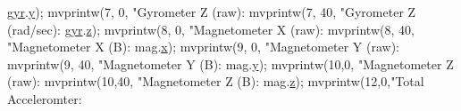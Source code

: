 \begin{DoxyCode}
{{{{{{{{{{      \hyperlink{structIMU__DATA__STRUCT_1_1calibrated_a8a54aded6ce608f1b7d2b4a0c52c248b}{gyr}.\hyperlink{structDATA__XYZ__DOUBLE_a198a27b5df3b5b0bf461b0e481e22a82}{y});
        mvprintw(7, 0, \textcolor{stringliteral}{"Gyrometer Z (raw):     %
        mvprintw(7, 40, \textcolor{stringliteral}{"Gyrometer Z (rad/sec):   %
      \hyperlink{structIMU__DATA__STRUCT_1_1calibrated_a8a54aded6ce608f1b7d2b4a0c52c248b}{gyr}.\hyperlink{structDATA__XYZ__DOUBLE_a9556e8868c223ff3e28756ea18a284c0}{z});
        mvprintw(8, 0, \textcolor{stringliteral}{"Magnetometer X (raw):  %
        mvprintw(8, 40, \textcolor{stringliteral}{"Magnetometer X (B):     %
      mag}.\hyperlink{structDATA__XYZ__DOUBLE_a22868cc99a423900e7b82d015a5eb91f}{x});
        mvprintw(9, 0, \textcolor{stringliteral}{"Magnetometer Y (raw):  %
        mvprintw(9, 40, \textcolor{stringliteral}{"Magnetometer Y (B):     %
      mag}.\hyperlink{structDATA__XYZ__DOUBLE_a198a27b5df3b5b0bf461b0e481e22a82}{y});
        mvprintw(10,0, \textcolor{stringliteral}{"Magnetometer Z (raw):  %
        mvprintw(10,40, \textcolor{stringliteral}{"Magnetometer Z (B):     %
      mag}.\hyperlink{structDATA__XYZ__DOUBLE_a9556e8868c223ff3e28756ea18a284c0}{z});
        mvprintw(12,0,\textcolor{stringliteral}{"Total Acceleromter: %
}}}}}}}}}}}}}}}}
\end{DoxyCode}

